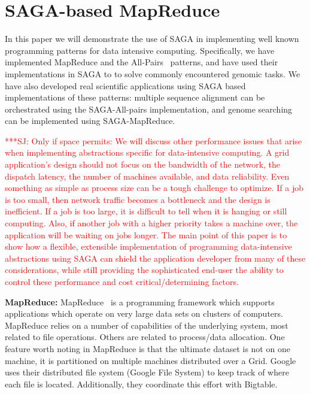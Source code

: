 \documentclass[conference,final]{IEEEtran}
\newcommand{\jhanote}[1]{ {\textcolor{red} { ***SJ: #1 }}}
\newcommand{\jhanote}[1]{}
\begin{document}
\section{SAGA-based MapReduce}

In this paper we will demonstrate the use of SAGA in implementing well
known programming patterns for data intensive computing.
Specifically, we have implemented MapReduce and the
All-Pairs~\cite{allpairs_short} patterns, and have used their
implementations in SAGA to to solve commonly encountered genomic
tasks.  We have also developed real scientific applications using SAGA
based implementations of these patterns: multiple sequence alignment
can be orchestrated using the SAGA-All-pairs implementation, and
genome searching can be implemented using SAGA-MapReduce.

\jhanote{Only if space permits: We will discuss other performance
  issues that arise when implementing abstractions specific for
  data-intensive computing.  A grid application's design should not
  focus on the bandwidth of the network, the dispatch latency, the
  number of machines available, and data reliability.  Even something
  as simple as process size can be a tough challenge to optimize.  If
  a job is too small, then network traffic becomes a bottleneck and
  the design is inefficient.  If a job is too large, it is difficult
  to tell when it is hanging or still computing.  Also, if another job
  with a higher priority takes a machine over, the application will be
  waiting on jobs longer.  The main point of this paper is to show how
  a flexible, extensible implementation of programming data-intensive
  abstractions using SAGA can shield the application developer from
  many of these considerations, while still providing the
  sophisticated end-user the ability to control these performance and
  cost critical/determining factors.}

{\bf MapReduce: } MapReduce~\cite{mapreduce-paper} is a programming
framework which supports applications which operate on very large data
sets on clusters of computers.  MapReduce relies on a number of
capabilities of the underlying system, most related to file
operations.  Others are related to process/data
allocation. %
One feature worth noting in MapReduce is that the ultimate dataset is
not on one machine, it is partitioned on multiple machines distributed
over a Grid. Google uses their distributed file system (Google File
System) to keep track of where each file is located.  Additionally,
they coordinate this effort with Bigtable.
\end{document}
